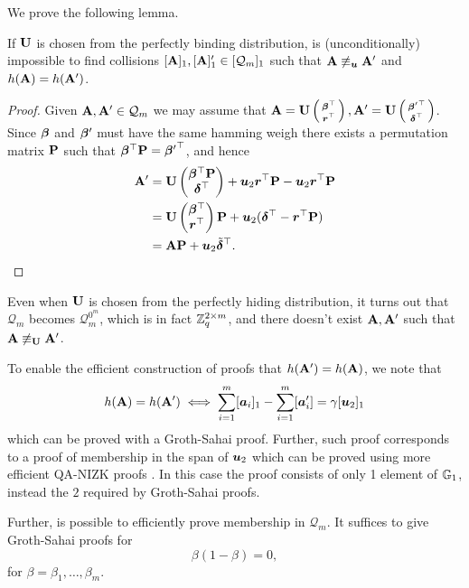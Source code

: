 We prove the following lemma.
\begin{lemma}
If $\mathbf{{U}}$ is chosen from the perfectly binding distribution, is (unconditionally) impossible to find collisions $[\mathbf{{A}}]_1,[\mathbf{{A}}]_1'\in[\mathcal{Q}_m]_1$ such that $\mathbf{{A}}\not\equiv_{\boldsymbol{u}}\mathbf{{A}}'$ and $h(\mathbf{{A}})=h(\mathbf{{A}}')$.
\end{lemma}
\begin{proof}
Given $\mathbf{{A}},\mathbf{{A}}'\in\mathcal{Q}_m$ we may assume that $\mathbf{{A}}=\mathbf{{U}}\left(\begin{smallmatrix}{\boldsymbol{\beta}}^\top\\{\boldsymbol{r}}^\top\end{smallmatrix}\right),\mathbf{{A}}'=\mathbf{{U}}\left(\begin{smallmatrix}{{\boldsymbol{\beta}}'}^\top\\{\boldsymbol{\delta}}^\top\end{smallmatrix}\right)$. Since ${\boldsymbol{\beta}}$ and ${\boldsymbol{\beta}}'$ must have the same hamming weigh there exists a permutation matrix $\mathbf{{P}}$ such that ${\boldsymbol{\beta}}^\top\mathbf{{P}} = {{\boldsymbol{\beta}}'}^\top$, and hence
\begin{align*}
\mathbf{{A}}' &= \mathbf{{U}}\left(\begin{matrix}{\boldsymbol{\beta}}^\top\mathbf{{P}}\\{\boldsymbol{\delta}}^\top\end{matrix}\right)+ {\boldsymbol{u}}_2{\boldsymbol{r}}^\top\mathbf{{P}} - {\boldsymbol{u}}_2{\boldsymbol{r}}^\top\mathbf{{P}}\\
&=
\mathbf{{U}} \left(\begin{matrix}{\boldsymbol{\beta}}^\top\\{\boldsymbol{r}}^\top\end{matrix}\right)\mathbf{{P}} + {\boldsymbol{u}}_2({\boldsymbol{\delta}}^\top-{\boldsymbol{r}}^\top\mathbf{{P}})\\
 &=
 \mathbf{{A}}\mathbf{{P}} + {\boldsymbol{u}}_2\tilde{{\boldsymbol{\delta}}}^\top.
\end{align*}
\end{proof}

Even 
when $\mathbf{{U}}$ is chosen from the perfectly hiding distribution, it turns out that $\mathcal{Q}_m$ becomes $\mathcal{Q}_m^{0^m}$, which is in fact $\mathbb{Z}_q^{2\times m}$, and there doesn't exist $\mathbf{{A}},\mathbf{{A}}'$ such that $\mathbf{{A}}\not\equiv_{\mathbf{{U}}}\mathbf{{A}}'$. 

To enable the efficient construction of proofs that $h(\mathbf{{A}}') = h(\mathbf{{A}})$, we note that
\begin{equation}
h(\mathbf{{A}})=h(\mathbf{{A}}') \iff \sum_{i=1}^{m}[{\boldsymbol{a}}_i]_1 - \sum_{i=1}^m[{\boldsymbol{a}}'_i] = \gamma[{\boldsymbol{u}}_2]_1
\end{equation}
which can be proved with a Groth-Sahai proof. Further, such proof corresponds to a proof of membership in the span of ${\boldsymbol{u}}_2$ which can be proved using more efficient QA-NIZK proofs \cite{C:JutRoy14,EC:KilWee15}. In this case the proof consists of only 1 element of $\mathbb{G}_1$, instead the $2$ required by Groth-Sahai proofs.

Further, is possible to efficiently prove membership in $\mathcal{Q}_m$. It suffices to give Groth-Sahai proofs for
\begin{equation}
\beta(1-\beta)=0 \label{eq:Qm-memb},
\end{equation}
for $\beta=\beta_1,\ldots,\beta_m$.


